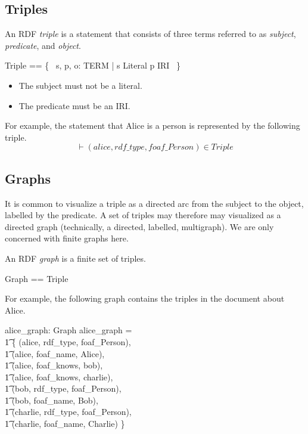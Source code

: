 \documentclass{article}
\begin{document}
\subsection{Triples}

An RDF {\em triple} is a statement that consists of three terms referred to as {\em subject}, {\em predicate}, and {\em object}.
\begin{zed}
Triple == \{~ s, p, o: TERM | s \notin Literal \land p \in IRI ~\}
\end{zed}
\begin{itemize}
\item The subject must not be a literal.
\item The predicate must be an IRI.
\end{itemize}

For example, the statement that Alice is a person is represented by the following triple.
\[\vdash 
	(alice, rdf\_type, foaf\_Person) \in Triple
\]

\subsection{Graphs}

It is common to visualize a triple as a directed arc from the subject to the object, labelled by the predicate.
A set of triples may therefore may visualized as a directed graph (technically, a directed, labelled, multigraph).
We are only concerned with finite graphs here.

An RDF {\em graph} is a finite set of triples.
\begin{zed}
Graph == \finset Triple
\end{zed}

For example, the following graph contains the triples in the document about Alice.
\begin{axdef}
	alice\_graph: Graph
\where
	alice\_graph = \\
\t1		\{ (alice, rdf\_type, foaf\_Person), \\
\t1		(alice, foaf\_name, Alice), \\
\t1		(alice, foaf\_knows, bob), \\
\t1		(alice, foaf\_knows, charlie), \\
\t1		(bob, rdf\_type, foaf\_Person), \\
\t1		(bob, foaf\_name, Bob), \\
\t1		(charlie, rdf\_type, foaf\_Person), \\
\t1		(charlie, foaf\_name, Charlie) \}
\end{axdef}
\end{document}
